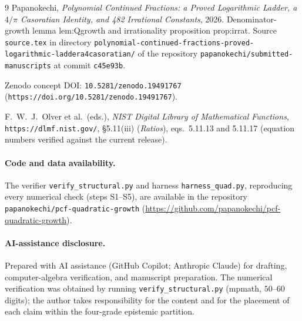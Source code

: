 \documentclass[11pt]{article}
\begin{document}
\begin{thebibliography}{9}
Papanokechi,
\emph{Polynomial Continued Fractions: a Proved Logarithmic Ladder, a $4/\pi$
Casoratian Identity, and 482 Irrational Constants}, 2026.
Denominator-growth lemma \textsf{lem:Qgrowth} and irrationality proposition
\textsf{prop:irrat}. Source \texttt{source.tex} in directory
\texttt{polynomial-continued-fractions-proved-logarithmic-laddera4casoratian/} of
the repository \texttt{papanokechi/submitted-manuscripts} at commit
\texttt{c45e93b}.
\par\smallskip\noindent
Zenodo concept DOI: \texttt{10.5281/zenodo.19491767}
(\texttt{https://doi.org/10.5281/zenodo.19491767}).

F.~W.~J.~Olver et al.\ (eds.),
\emph{NIST Digital Library of Mathematical Functions},
\texttt{https://dlmf.nist.gov/}, \S5.11(iii) (\emph{Ratios}), eqs.~5.11.13 and
5.11.17 (equation numbers verified against the current release).
\end{thebibliography}

\paragraph{Code and data availability.}
The verifier \texttt{verify\_structural.py} and harness \texttt{harness\_quad.py},
reproducing every numerical check (steps S1--S5), are available in the repository
\texttt{papanokechi/pcf-quadratic-growth}
(\url{https://github.com/papanokechi/pcf-quadratic-growth}).

\paragraph{AI-assistance disclosure.}
Prepared with AI assistance (GitHub Copilot; Anthropic Claude) for drafting,
computer-algebra verification, and manuscript preparation. The numerical
verification was obtained by running \texttt{verify\_structural.py} (mpmath,
$50$--$60$ digits); the author takes responsibility for the content and for the
placement of each claim within the four-grade epistemic partition.
\end{document}
